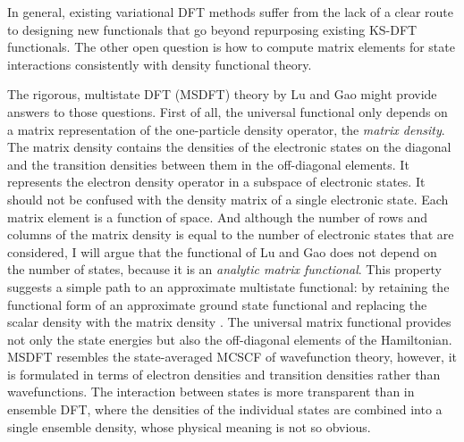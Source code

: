 \documentclass[journal=jpclcd,manuscript=letter]{achemso}
\begin{document}
In general, existing variational DFT methods suffer from the lack of a clear route to designing new
functionals that go beyond repurposing existing KS-DFT functionals. The other open question is how
to compute matrix elements for state interactions consistently with density functional theory.

The rigorous, multistate DFT (MSDFT) theory by Lu and Gao \cite{Lu2022JPCL} might provide answers to those questions.
First of all, the universal functional only depends on a matrix representation of the one-particle density
operator, the \emph{matrix density}. The matrix density contains the densities of the electronic states on the diagonal
and the transition densities between them in the off-diagonal elements. It represents the electron density operator
in a subspace of electronic states. It should not be confused with the density matrix of a single electronic state.
Each matrix element is a function of space. And although the number of rows and columns of the matrix density is equal
to the number of electronic states that are considered, I will
argue that the functional of Lu and Gao does not depend on the number of states,
because it is an \emph{analytic matrix functional}.
This property suggests a simple path to an approximate multistate functional: by retaining the functional form
of an approximate ground state functional and replacing the scalar density with the matrix density \cite{lu_gao_2021_chemrxiv}.
The universal matrix functional provides not only the state energies but also the off-diagonal elements of the Hamiltonian.
MSDFT resembles the state-averaged MCSCF of wavefunction theory,
however, it is formulated in terms of electron densities and transition densities rather than wavefunctions.
The interaction between states is more transparent than in ensemble DFT,
where the densities of the individual states are combined into a single ensemble density,
whose physical meaning is not so obvious.
\end{document}
